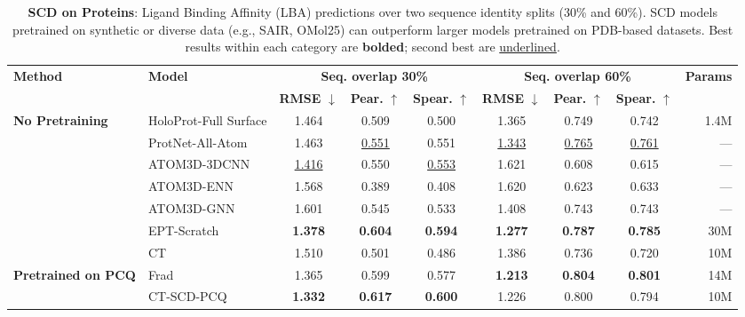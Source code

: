 \begin{table}[t]
\centering
\caption{\textbf{SCD on Proteins}: Ligand Binding Affinity (LBA) predictions over two sequence identity splits (30\% and 60\%). SCD models pretrained on synthetic or diverse data (e.g., SAIR, OMol25) can outperform larger models pretrained on PDB-based datasets. Best results within each category are \textbf{bolded}; second best are \underline{underlined}.}
\label{tab:lba_full}
\small
\setlength{\tabcolsep}{3pt} %
\begin{tabular*}{\textwidth}{@{\extracolsep{\fill}}l l ccc ccc r}
\toprule
\textbf{Method} & \textbf{Model} & \multicolumn{3}{c}{\textbf{Seq. overlap 30\%}} & \multicolumn{3}{c}{\textbf{Seq. overlap 60\%}} & \textbf{Params} \\
\cmidrule(lr){3-5} \cmidrule(lr){6-8}
& & \textbf{RMSE} $\downarrow$ & \textbf{Pear.} $\uparrow$ & \textbf{Spear.} $\uparrow$ & \textbf{RMSE} $\downarrow$ & \textbf{Pear.} $\uparrow$ & \textbf{Spear.} $\uparrow$ & \\

\midrule
\textbf{No Pretraining} 
 & HoloProt-Full Surface \cite{Holoprot_somnath2021multi} & 1.464 & 0.509 & 0.500 & 1.365 & 0.749 & 0.742  & 1.4M\\
 & ProtNet-All-Atom \cite{ProtNet_wang2023}& 1.463 & \underline{0.551} & 0.551 & \underline{1.343} & \underline{0.765} & \underline{0.761}  & --- \\
 & ATOM3D-3DCNN \cite{LBA_dataset} & \underline{1.416} & 0.550 & \underline{0.553} & 1.621 & 0.608 & 0.615  & --- \\
 & ATOM3D-ENN \cite{LBA_dataset}& 1.568 & 0.389 & 0.408 & 1.620 & 0.623 & 0.633  & --- \\
 & ATOM3D-GNN \cite{LBA_dataset}& 1.601 & 0.545 & 0.533 & 1.408 & 0.743 &0.743  & ---\\
 & EPT-Scratch \cite{EPT_jiao2025} & \textbf{1.378} & \textbf{0.604}& \textbf{0.594}& \textbf{1.277}& \textbf{0.787}& \textbf{0.785} &30M\\
 & CT & 1.510& 0.501 & 0.486 & 1.386 & 0.736 & 0.720 &10M\\

\midrule
\textbf{Pretrained on PCQ} 
& Frad \cite{Frad_Ni2024}& 1.365& 0.599 & 0.577 & \textbf{1.213} & \textbf{0.804} & \textbf{0.801} &14M\\
& CT-SCD-PCQ & \textbf{1.332}& \textbf{0.617}& \textbf{0.600} & 1.226 & 0.800 & 0.794  &10M\\


\end{tabular*}
\end{table}
